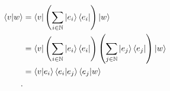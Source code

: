 \begin{align*}
  \braket{v|w} &= \bra{v} \left(\sum_{i \in \mathbb{N}} \ket{e_i}\bra{e_i}\right) \ket{w} \\
               &= \bra{v} \left(\sum_{i \in \mathbb{N}} \ket{e_i}\bra{e_i}\right) \left(\sum_{j \in \mathbb{N}}\ket{e_j}\bra{e_j}\right) \ket{w} \\
               &= \braket{v|e_i}\braket{e_i|e_j}\braket{e_j|w} \\
.\end{align*}

